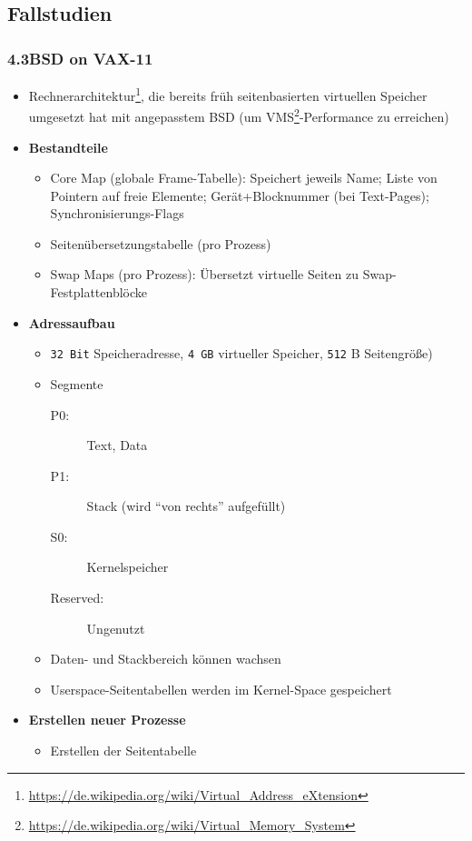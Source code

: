 \subsection{Fallstudien}

\subsubsection{4.3BSD on VAX-11}
\begin{itemize}
	\item Rechnerarchitektur\footnote{\url{https://de.wikipedia.org/wiki/Virtual_Address_eXtension}}, die bereits früh seitenbasierten virtuellen Speicher umgesetzt hat mit angepasstem BSD (um VMS\footnote{\url{https://de.wikipedia.org/wiki/Virtual_Memory_System}}-Performance zu erreichen)
	\item \textbf{Bestandteile}
	\begin{itemize}
		\item Core Map (globale Frame-Tabelle): Speichert jeweils Name; Liste von Pointern auf freie Elemente; Gerät+Blocknummer (bei Text-Pages); Synchronisierungs-Flags
		\item Seitenübersetzungstabelle (pro Prozess)
		\item Swap Maps (pro Prozess): Übersetzt virtuelle Seiten zu Swap-Festplattenblöcke
	\end{itemize}
	\item \textbf{Adressaufbau}
	\begin{itemize}
		\item \texttt{32 Bit} Speicheradresse, \texttt{4 GB} virtueller Speicher, \texttt{512} B Seitengröße)
		\item Segmente
		\begin{description}
			\item[P0:] Text, Data
			\item[P1:] Stack (wird "`von rechts"' aufgefüllt)
			\item[S0:] Kernelspeicher
			\item[Reserved:] Ungenutzt
		\end{description}
		\item Daten- und Stackbereich können wachsen
		\item Userspace-Seitentabellen werden im Kernel-Space gespeichert
	\end{itemize}
	\item \textbf{Erstellen neuer Prozesse}
	\begin{itemize}
		\item Erstellen der Seitentabelle

\end{itemize}
\end{itemize}
